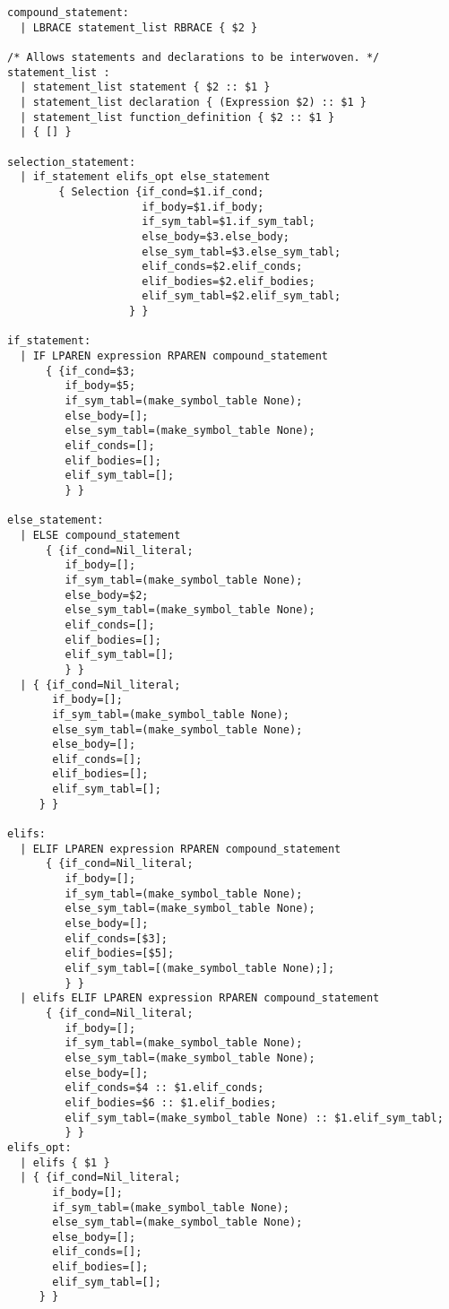 \begin{verbatim}
compound_statement:
  | LBRACE statement_list RBRACE { $2 }

/* Allows statements and declarations to be interwoven. */
statement_list :
  | statement_list statement { $2 :: $1 }
  | statement_list declaration { (Expression $2) :: $1 }
  | statement_list function_definition { $2 :: $1 }
  | { [] }

selection_statement:
  | if_statement elifs_opt else_statement
        { Selection {if_cond=$1.if_cond;
                     if_body=$1.if_body;
                     if_sym_tabl=$1.if_sym_tabl;
                     else_body=$3.else_body;
                     else_sym_tabl=$3.else_sym_tabl;
                     elif_conds=$2.elif_conds;
                     elif_bodies=$2.elif_bodies;
                     elif_sym_tabl=$2.elif_sym_tabl;
                   } }

if_statement:
  | IF LPAREN expression RPAREN compound_statement
      { {if_cond=$3;
         if_body=$5;
         if_sym_tabl=(make_symbol_table None);
         else_body=[];
         else_sym_tabl=(make_symbol_table None);
         elif_conds=[];
         elif_bodies=[];
         elif_sym_tabl=[];
         } }

else_statement:
  | ELSE compound_statement
      { {if_cond=Nil_literal;
         if_body=[];
         if_sym_tabl=(make_symbol_table None);
         else_body=$2;
         else_sym_tabl=(make_symbol_table None);
         elif_conds=[];
         elif_bodies=[];
         elif_sym_tabl=[];
         } }
  | { {if_cond=Nil_literal;
       if_body=[];
       if_sym_tabl=(make_symbol_table None);
       else_sym_tabl=(make_symbol_table None);
       else_body=[];
       elif_conds=[];
       elif_bodies=[];
       elif_sym_tabl=[];
     } }

elifs:
  | ELIF LPAREN expression RPAREN compound_statement
      { {if_cond=Nil_literal;
         if_body=[];
         if_sym_tabl=(make_symbol_table None);
         else_sym_tabl=(make_symbol_table None);
         else_body=[];
         elif_conds=[$3];
         elif_bodies=[$5];
         elif_sym_tabl=[(make_symbol_table None);];
         } }
  | elifs ELIF LPAREN expression RPAREN compound_statement
      { {if_cond=Nil_literal;
         if_body=[];
         if_sym_tabl=(make_symbol_table None);
         else_sym_tabl=(make_symbol_table None);
         else_body=[];
         elif_conds=$4 :: $1.elif_conds;
         elif_bodies=$6 :: $1.elif_bodies;
         elif_sym_tabl=(make_symbol_table None) :: $1.elif_sym_tabl;
         } }
elifs_opt:
  | elifs { $1 }
  | { {if_cond=Nil_literal;
       if_body=[];
       if_sym_tabl=(make_symbol_table None);
       else_sym_tabl=(make_symbol_table None);
       else_body=[];
       elif_conds=[];
       elif_bodies=[];
       elif_sym_tabl=[];
     } }


\end{verbatim}
